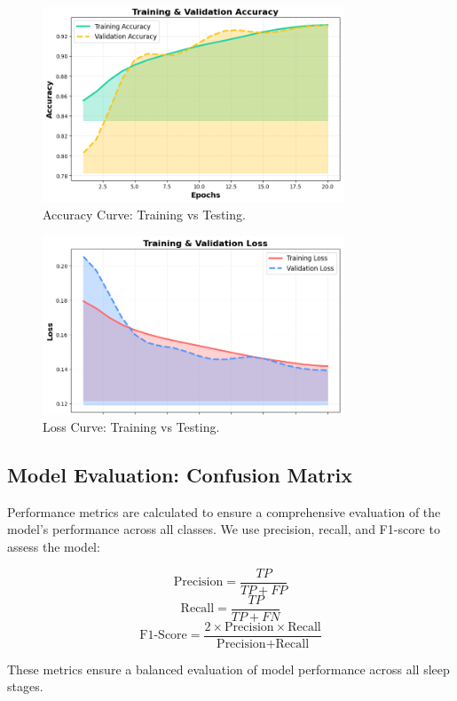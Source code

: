 \begin{figure}[h!]
    \centering
    \includegraphics[width=0.8\textwidth]{img/accuracy plot.png}
    \caption{Accuracy Curve: Training vs Testing.}
\end{figure}

\begin{figure}[h!]
    \centering
    \includegraphics[width=0.8\textwidth]{img/loss plot.png}
    \caption{Loss Curve: Training vs Testing.}
\end{figure}

\subsection{Model Evaluation: Confusion Matrix}

Performance metrics are calculated to ensure a comprehensive evaluation of the model's performance across all classes. We use precision, recall, and F1-score to assess the model:

\[
\text{Precision} = \frac{TP}{TP + FP}
\]
\[
\text{Recall} = \frac{TP}{TP + FN}
\]
\[
\text{F1-Score} = \frac{2 \times \text{Precision} \times \text{Recall}}{\text{Precision} + \text{Recall}}
\]

These metrics ensure a balanced evaluation of model performance across all sleep stages.

